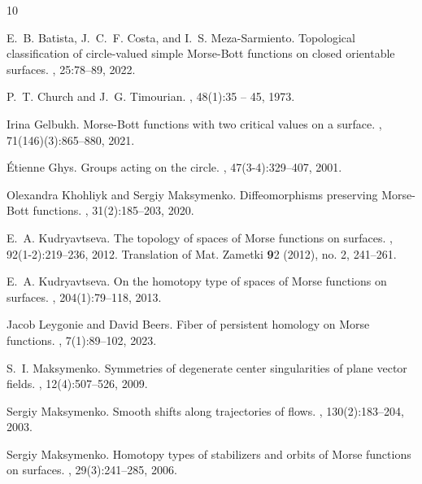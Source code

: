 \documentclass[10pt,reqno]{amsart}
\begin{document}
\begin{thebibliography}{10}
	
	E.~B. Batista, J.~C.~F. Costa, and I.~S. Meza-Sarmiento.
	\newblock Topological classification of circle-valued simple {M}orse-{B}ott
	functions on closed orientable surfaces.
	, 25:78--89, 2022.
	
	P.~T. Church and J.~G. Timourian.
	, 48(1):35 -- 45, 1973.
	
	Irina Gelbukh.
	\newblock Morse-{B}ott functions with two critical values on a surface.
	, 71(146)(3):865--880, 2021.
	
	\'Etienne Ghys.
	\newblock Groups acting on the circle.
	, 47(3-4):329--407, 2001.
	
	Olexandra Khohliyk and Sergiy Maksymenko.
	\newblock Diffeomorphisms preserving {M}orse-{B}ott functions.
	, 31(2):185--203, 2020.
	
	E.~A. Kudryavtseva.
	\newblock The topology of spaces of {M}orse functions on surfaces.
	, 92(1-2):219--236, 2012.
	\newblock Translation of Mat. Zametki {{\bf{9}}2} (2012), no. 2, 241--261.
	
	E.~A. Kudryavtseva.
	\newblock On the homotopy type of spaces of {M}orse functions on surfaces.
	, 204(1):79--118, 2013.
	
	Jacob Leygonie and David Beers.
	\newblock Fiber of persistent homology on {M}orse functions.
	, 7(1):89--102, 2023.
	
	S.~I. Maksymenko.
	\newblock Symmetries of degenerate center singularities of plane vector fields.
	, 12(4):507--526, 2009.
	
	Sergiy Maksymenko.
	\newblock Smooth shifts along trajectories of flows.
	, 130(2):183--204, 2003.
	
	Sergiy Maksymenko.
	\newblock Homotopy types of stabilizers and orbits of {M}orse functions on
	surfaces.
	, 29(3):241--285, 2006.
	

\end{thebibliography}
\end{document}
